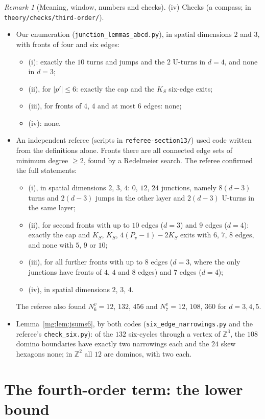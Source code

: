 \documentclass[11pt,a4paper]{article}
\theoremstyle{definition}
\theoremstyle{remark}
\newtheorem{remark}[theorem]{Remark}
\begin{document}
\begin{remark}[Meaning, window, numbers and checks]
(iv) Checks (a compass; in \texttt{theory/checks/third-order/}).
\begin{itemize}
\item Our enumeration (\texttt{junction\_lemmas\_abcd.py}), in spatial dimensions $2$ and $3$, with fronts of four and six edges:
\begin{itemize}
\item (i): exactly the $10$ turns and jumps and the $2$ U-turns in $d=4$, and none in $d=3$;
\item (ii), for $|p'|\le6$: exactly the cap and the $K_S$ six-edge exits;
\item (iii), for fronts of $4$, $4$ and at most $6$ edges: none;
\item (iv): none.
\end{itemize}
\item An independent referee (scripts in \texttt{referee-section13/}) used code written from the definitions alone. Fronts there are all connected edge sets of
minimum degree $\ge2$, found by a Redelmeier search. The referee confirmed the full statements:
\begin{itemize}
\item (i), in spatial dimensions $2$, $3$, $4$: $0$, $12$, $24$ junctions, namely $8(d-3)$ turns and $2(d-3)$ jumps in the other layer and $2(d-3)$ U-turns in the same layer;
\item (ii), for second fronts with up to $10$ edges ($d=3$) and $9$ edges ($d=4$): exactly the cap and $K_S$, $K_S$, $4(P_v-1)-2K_S$ exits with $6$, $7$, $8$ edges, and none with
$5$, $9$ or $10$;
\item (iii), for all further fronts with up to $8$ edges ($d=3$, where the only junctions have fronts of $4$, $4$ and $8$ edges) and $7$ edges ($d=4$);
\item (iv), in spatial dimensions $2$, $3$, $4$.
\end{itemize}
The referee also found $N^v_6=12$, $132$, $456$ and $N^v_7=12$, $108$, $360$ for $d=3,4,5$.
\item Lemma~\ref{mg:lem:jsums6}, by both codes (\texttt{six\_edge\_narrowings.py} and the referee's \texttt{check\_six.py}): of the $132$ six-cycles through a vertex of $\mathbb Z^3$, the $108$ domino boundaries have
exactly two narrowings each and the $24$ skew hexagons none; in $\mathbb Z^2$ all $12$ are dominos, with two each.
\end{itemize}
\end{remark}

\section{The fourth-order term: the lower bound}\label{mg:sec:fourthlower}
\end{document}
